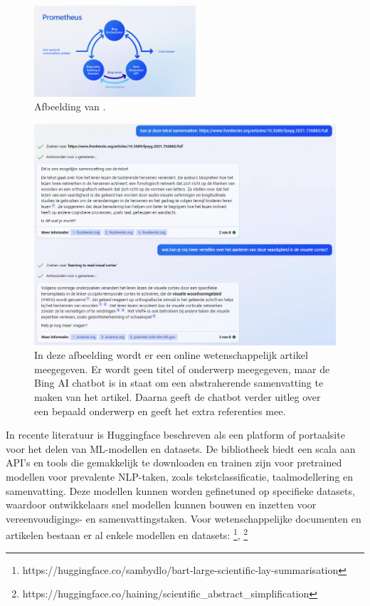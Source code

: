 \begin{figure}[H]
	\includegraphics[width=6cm]{img/bing-ai-prometheus.png}
	\caption{Afbeelding van \textcite{Ribas2023}.}
\end{figure}

\begin{figure}[H]
	\includegraphics{img/bing-ai-chatbot-example.png}
	\caption{In deze afbeelding wordt er een online wetenschappelijk artikel meegegeven. Er wordt geen titel of onderwerp meegegeven, maar de Bing AI chatbot is in staat om een abstraherende samenvatting te maken van het artikel. Daarna geeft de chatbot verder uitleg over een bepaald onderwerp en geeft het extra referenties mee.}
\end{figure}

\medspace

In recente literatuur is Huggingface beschreven als een platform of portaalsite voor het delen van ML-modellen en datasets. De bibliotheek biedt een scala aan API's en tools die gemakkelijk te downloaden en trainen zijn voor pretrained modellen voor prevalente NLP-taken, zoals tekstclassificatie, taalmodellering en samenvatting. Deze modellen kunnen worden gefinetuned op specifieke datasets, waardoor ontwikkelaars snel modellen kunnen bouwen en inzetten voor vereenvoudigings- en samenvattingstaken. Voor wetenschappelijke documenten en artikelen bestaan er al enkele modellen en datasets: \footnote{https://huggingface.co/sambydlo/bart-large-scientific-lay-summarisation}, \footnote{https://huggingface.co/haining/scientific\_abstract\_simplification}

